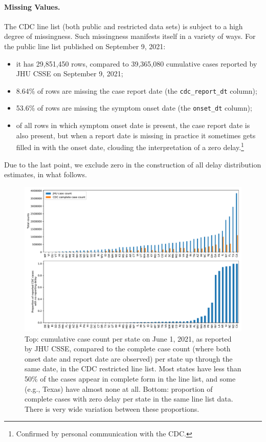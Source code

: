 \documentclass[sts]{imsart}
\theoremstyle{plain}
\theoremstyle{definition}
\theoremstyle{remark}
\begin{document}
\smallskip
\paragraph*{Missing Values.}

The CDC line list (both public and restricted data sets) is subject to a high
degree of missingness. Such missingness manifests itself in a variety of
ways. For the public line list published on September 9, 2021: 
\begin{itemize}
\item it has 29,851,450 rows, compared to 39,365,080 cumulative cases reported  
  by JHU CSSE on September 9, 2021;
\item 8.64\% of rows are missing the case report date (the
  \texttt{cdc\_report\_dt} column);    
\item 53.6\% of rows are missing the symptom onset date (the \texttt{onset\_dt}
  column);   
\item of all rows in which symptom onset date is present, the case report date
  is also present, but when a report date is missing in practice it sometimes 
  gets filled in with the onset date, clouding the interpretation of a zero 
  delay.\footnote{Confirmed by personal communication with the CDC.}     
\end{itemize}
Due to the last point, we exclude zero in the construction of all delay
distribution estimates, in what follows. 

\begin{figure}[tb]
\centering
\includegraphics[width=0.95\linewidth]{./figures/combined_linelist_plots_20210601.pdf}
\caption{Top: cumulative case count per state on June 1, 2021, as reported by
  JHU CSSE, compared to the complete case count (where both onset date and
  report date are observed) per state up through the same date, in the CDC
  restricted line list. Most states have less than 50\% of the cases appear in
  complete form in the line list, and some (e.g., Texas) have almost none at
  all. Bottom: proportion of complete cases with zero delay per state in the
  same line list data. There is very wide variation between these proportions.} 
\label{fig:line_list_state}
\end{figure}
\end{document}
